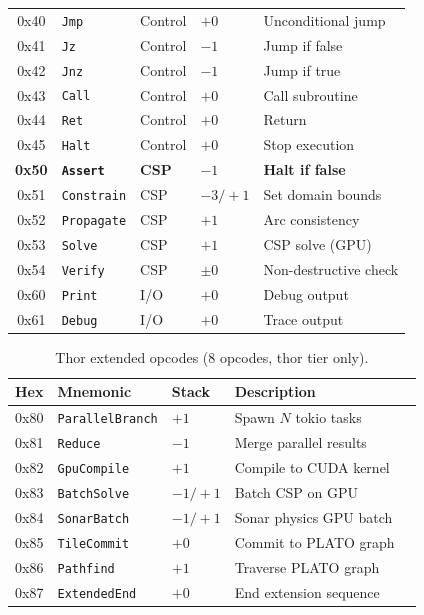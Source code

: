 \documentclass[sigplan,10pt,review]{acmart}
\begin{document}
\begin{table}[h]
\begin{tabular}{cllll}
\midrule
0x40 & \texttt{Jmp}       & Control  & $+0$   & Unconditional jump \\
0x41 & \texttt{Jz}        & Control  & $-1$   & Jump if false \\
0x42 & \texttt{Jnz}       & Control  & $-1$   & Jump if true \\
0x43 & \texttt{Call}      & Control  & $+0$   & Call subroutine \\
0x44 & \texttt{Ret}       & Control  & $+0$   & Return \\
0x45 & \texttt{Halt}      & Control  & $+0$   & Stop execution \\
\midrule
\textbf{0x50} & \textbf{\texttt{Assert}}    & \textbf{CSP} & $-1$   & \textbf{Halt if false} \\
0x51 & \texttt{Constrain} & CSP      & $-3/+1$ & Set domain bounds \\
0x52 & \texttt{Propagate} & CSP      & $+1$   & Arc consistency \\
0x53 & \texttt{Solve}     & CSP      & $+1$   & CSP solve (GPU) \\
0x54 & \texttt{Verify}    & CSP      & $\pm0$ & Non-destructive check \\
\midrule
0x60 & \texttt{Print}     & I/O      & $+0$   & Debug output \\
0x61 & \texttt{Debug}     & I/O      & $+0$   & Trace output \\
\bottomrule
\end{tabular}
\end{table}

\begin{table}[h]
\centering
\caption{Thor extended opcodes (8 opcodes, thor tier only).}
\label{tab:thor-opcodes}
\renewcommand{\arraystretch}{1.1}
\begin{tabular}{cllll}
\toprule
\textbf{Hex} & \textbf{Mnemonic} & \textbf{Stack} & \textbf{Description} \\
\midrule
0x80 & \texttt{ParallelBranch} & $+1$    & Spawn $N$ tokio tasks \\
0x81 & \texttt{Reduce}         & $-1$    & Merge parallel results \\
0x82 & \texttt{GpuCompile}     & $+1$    & Compile to CUDA kernel \\
0x83 & \texttt{BatchSolve}     & $-1/+1$ & Batch CSP on GPU \\
0x84 & \texttt{SonarBatch}     & $-1/+1$ & Sonar physics GPU batch \\
0x85 & \texttt{TileCommit}     & $+0$    & Commit to PLATO graph \\
0x86 & \texttt{Pathfind}       & $+1$    & Traverse PLATO graph \\
0x87 & \texttt{ExtendedEnd}    & $+0$    & End extension sequence \\
\bottomrule
\end{tabular}
\end{table}
\end{document}

